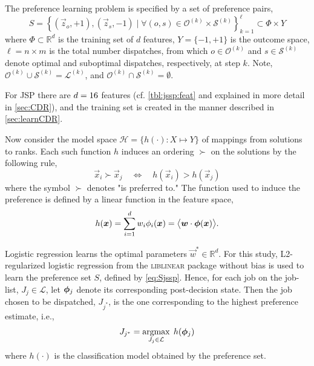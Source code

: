 \documentclass[smallextended]{svjour3}
\begin{document}
The preference learning problem is specified by a set of preference pairs,
\begin{equation}
	S = 
	\left\{\left(\vec{z}_o,+1\right),\left(\vec{z}_s,-1\right)
	\;|\;\forall (o,s) \in \mathcal{O}^{(k)} \times \mathcal{S}^{(k)}
	\right\}_{k=1}^{\ell} \subset \Phi\times Y \label{eq:Sjssp}
\end{equation}
where $\Phi\subset \mathbb{R}^d$ is the training set of $d$ features,  
$Y=\{-1,+1\}$ is the outcome space, $\ell=n\times m$ is the total number 
dispatches, from which $o\in\mathcal{O}^{(k)}$ and $s\in \mathcal{S}^{(k)}$ 
denote optimal and suboptimal dispatches, respectively, at step $k$. 
Note, $\mathcal{O}^{(k)}\cup\mathcal{S}^{(k)}=\mathcal{L}^{(k)}$, and 
$\mathcal{O}^{(k)}\cap\mathcal{S}^{(k)}=\emptyset$. 

For JSP there are $d=16$ features (cf. \cref{tbl:jssp:feat} and 
explained in more detail in \cref{sec:CDR}), and the training set is created in 
the manner described in \cref{sec:learnCDR}.

Now consider the model space $\mathcal{H} = \{h(\cdot) : X \mapsto Y\}$ of 
mappings from solutions to ranks. Each such function $h$ induces an ordering 
$\succ$ on the solutions  by the following rule,
\begin{equation}\label{eq:linear}
	\vec{x}_i \succ \vec{x}_j \quad \Leftrightarrow \quad h(\vec{x}_i) > 
	h(\vec{x}_j)
\end{equation}
where the symbol $\succ$ denotes "is preferred to."  The function used to 
induce the preference is defined by a linear function in the feature space,
\begin{equation}\label{eq:jssp:linweights}
	h(\vec{x})=\sum_{i=1}^d w_i\phi_i(\vec{x})=\inner{\vec{w}}{\vphi(\vec{x})}.
\end{equation}

Logistic regression learns the optimal parameters $\vec{w}^*\in\mathbb{R}^d$. 
For this study, L2-regularized logistic regression from the \textsc{liblinear} 
package \cite{liblinear} without bias is used to learn the preference set $S$, 
defined by \cref{eq:Sjssp}.
Hence, for each job on the job-list, $J_j\in\mathcal{L}$, let $\bm{\phi}_j$ denote 
its corresponding  post-decision state. Then the job chosen to be dispatched, 
$J_{j^*}$, is the one corresponding to the highest preference estimate, i.e.,
\begin{equation}\label{eq:lin}
	J_{j^*}=\mathop{\rm argmax}_{J_j\in \mathcal{L}}\; h(\bm{\phi}_j)
\end{equation}
where $h(\cdot)$ is the classification model obtained by the preference set.
\end{document}
